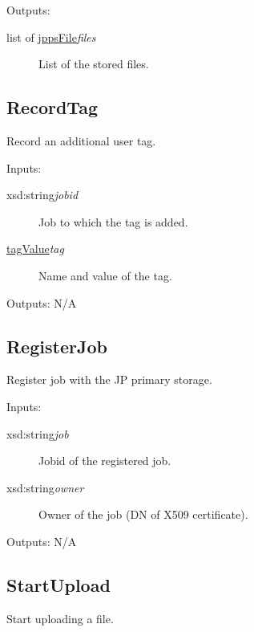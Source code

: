 Outputs: 
\begin{description}
\item[{list of \hyperlink{type:jppsFile}{jppsFile}{\ttfamily\itshape{{files}}}}]\null{}
List of the stored files.
\end{description}
\noindent 
\subsection{RecordTag}
\label{op:RecordTag}\hypertarget{op:RecordTag}{}%

Record an additional user tag.

Inputs: 
\begin{description}
\item[{xsd:string{\ttfamily\itshape{{jobid}}}}]\null{}
Job to which the tag is added.
\item[{\hyperlink{type:tagValue}{tagValue}{\ttfamily\itshape{{tag}}}}]\null{}
Name and value of the tag.
\end{description}
\noindent 

Outputs: N/A
\subsection{RegisterJob}
\label{op:RegisterJob}\hypertarget{op:RegisterJob}{}%

Register job with the JP primary storage.

Inputs: 
\begin{description}
\item[{xsd:string{\ttfamily\itshape{{job}}}}]\null{}
Jobid of the registered job.
\item[{xsd:string{\ttfamily\itshape{{owner}}}}]\null{}
Owner of the job (DN of X509 certificate).
\end{description}
\noindent 

Outputs: N/A
\subsection{StartUpload}
\label{op:StartUpload}\hypertarget{op:StartUpload}{}%

Start uploading a file.

